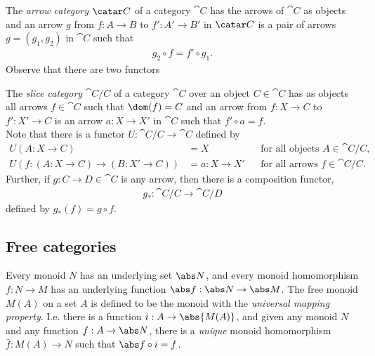 \documentclass{article}
\begin{document}
\begin{definition}
    The \emph{arrow category} $\catar C$ of a category $\cat C$
    has the arrows of $\cat C$ as objects and an arrow $g$ from
    $f:A\to B$ to $f':A'\to B'$ in $\catar C$ is a pair of arrows
    $g=(g_1, g_2)$ in $\cat C$ such that
    \begin{align*}
        g_2\circ f = f'\circ g_1.
    \end{align*}
    Observe that there are two functors
    \begin{center}
    \end{center}
\end{definition}

\begin{definition}
    The \emph{slice category} $\cat C/C$ of a category $\cat C$ over an
    object $C\in\cat C$ has as objects all arrows $f\in\cat C$ such that
    $\dom(f)=C$ and an arrow from $f:X\to C$ to $f':X'\to C$ is an arrow
    $a:X\to X'$ in $\cat C$ such that $f'\circ a = f$.\\
    Note that there is a functor $U:\cat C/C \to \cat C$ defined by
    \begin{align*}
        U(A:X\to C)                   & = X
                                      &             & \text{for all objects }A\in\cat C/C, \\
        U(f:(A:X\to C)\to(B:X'\to C)) & = a:X\to X'
                                      &             & \text{for all arrows }f\in\cat C/C.
    \end{align*}
    Further, if $g:C\to D\in\cat C$ is any arrow, then there is a composition
    functor,
    \begin{align*}
        g_*:\cat C/C\to\cat C/D
    \end{align*}
    defined by $g_*(f)= g\circ f$.
\end{definition}

\subsection{Free categories}

\begin{definition}[UMP of $M(A)$]
    Every monoid $N$ has an underlying set $\abs N$, and every monoid
    homomorphism $f:N\to M$ has an underlying function $\abs f: \abs N
        \to \abs M$.
    The free monoid $M(A)$ on a set $A$ is defined to be
    the monoid with the \emph{universal mapping property}.
    I.e. there is a function $i:A\to \abs{M(A)}$, and given any
    monoid $N$ and any function $f:A\to\abs N$, there is a
    \emph{unique} monoid homomorphism $\bar f: M(A)\to N$
    such that $\abs f \circ i = f$.
\end{definition}
\end{document}
